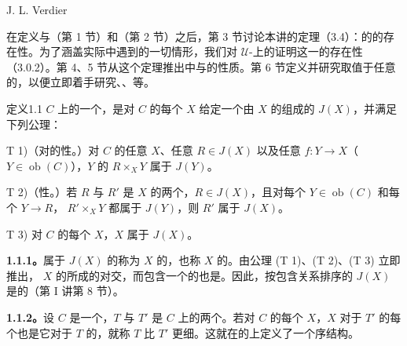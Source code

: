 \begin{center}J. L. Verdier\end{center}
在定义与（第 1 节）和（第 2 节）之后，第 3 节讨论本讲的定理（3.4）：的的存在性。为了涵盖实际中遇到的一切情形，我们对 $\mathcal U$-上的证明这一的存在性（3.0.2）。第 4、5 节从这个定理推出中与的性质。第 6 节定义并研究取值于任意的，以便立即着手研究、、等。

\begin{SGAresult}{定义}{1.1}
 $C$ 上的一个，是对 $C$ 的每个 $X$ 给定一个由 $X$ 的组成的 $J(X)$，并满足下列公理：
\par T 1)（对的性。）对 $C$ 的任意 $X$、任意 $R\in J(X)$ 以及任意 $f:Y\to X$（$Y\in\operatorname{ob}(C)$），$Y$ 的 $R\times_XY$ 属于 $J(Y)$。
\par T 2)（性。）若 $R$ 与 $R'$ 是 $X$ 的两个，$R\in J(X)$，且对每个 $Y\in\operatorname{ob}(C)$ 和每个 $Y\to R$， $R'\times_XY$ 都属于 $J(Y)$，则 $R'$ 属于 $J(X)$。
\par T 3) 对 $C$ 的每个 $X$，$X$ 属于 $J(X)$。
\end{SGAresult}
\textbf{1.1.1。}属于 $J(X)$ 的称为 $X$ 的，也称 $X$ 的。由公理 (T 1)、(T 2)、(T 3) 立即推出， $X$ 的所成的对交，而包含一个的也是。因此，按包含关系排序的 $J(X)$ 是的（第 I 讲第 8 节）。

\textbf{1.1.2。}设 $C$ 是一个，$T$ 与 $T'$ 是 $C$ 上的两个。若对 $C$ 的每个 $X$，$X$ 对于 $T'$ 的每个也是它对于 $T$ 的，就称 $T$ 比 $T'$ 更细。这就在的上定义了一个序结构。

